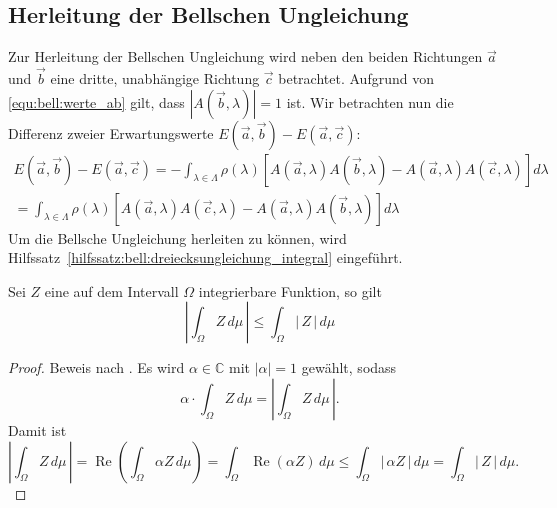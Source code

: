 \begin{refsection}
\subsection{Herleitung der Bellschen Ungleichung}
Zur Herleitung der Bellschen Ungleichung wird neben den beiden Richtungen 
$\vec{a}$ und $\vec{b}$ eine dritte, unabh\"angige Richtung $\vec{c}$ 
betrachtet. 
Aufgrund von \eqref{equ:bell:werte_ab} gilt, dass
$|A(\vec{b},\lambda)| = 1$ ist.
Wir betrachten nun die Differenz zweier Erwartungswerte
$E(\vec{a},\vec{b}) - E(\vec{a},\vec{c})$:
\begin{equation}\label{equ:bell:diff_e}
\begin{split}
    E(\vec{a},\vec{b}) - E(\vec{a},\vec{c}) =
    - \int_{\lambda\in\Lambda} \rho(\lambda) \left[ 
        A(\vec{a},\lambda) A(\vec{b},\lambda) - 
        A(\vec{a},\lambda) A(\vec{c},\lambda)
    \right] d\lambda \\
    = \int_{\lambda\in\Lambda} \rho(\lambda) \left[
         A(\vec{a},\lambda)A(\vec{c},\lambda) - 
         A(\vec{a},\lambda)A(\vec{b},\lambda)
    \right] d\lambda
\end{split}
\end{equation}
Um die Bellsche Ungleichung herleiten zu k\"onnen, wird 
Hilfssatz~\ref{hilfssatz:bell:dreiecksungleichung_integral}
eingef\"uhrt.
\begin{hilfssatz}\label{hilfssatz:bell:dreiecksungleichung_integral}
    Sei $Z$ eine auf dem Intervall $\Omega$ integrierbare Funktion, so gilt
    \[
        \left|\int_{\Omega} Z\, d\mu\,\right| 
        \leq \int_{\Omega} |\,Z\,|\, d\mu
    \]
\end{hilfssatz}
\begin{proof}
    Beweis nach \cite{Bell:HilfssatzTriangle}.
    Es wird $\alpha\in\mathbb{C}$ mit $|\alpha| = 1$ gew\"ahlt, sodass
    \[
        \alpha \cdot \int_{\Omega} Z\, d\mu = 
        \left|\int_{\Omega} Z\, d\mu\,\right|.
    \]
    Damit ist
    \[
        \left|\int_{\Omega} Z\, d\mu\,\right| = 
        \operatorname{Re}\left( \int_{\Omega}\alpha Z \,d\mu \right) = 
        \int_{\Omega}\operatorname{Re}(\alpha Z)\,d\mu
        \leq
        \int_{\Omega} |\,\alpha Z\,|\, d\mu = 
        \int_{\Omega} |\,Z\,|\, d\mu.
    \]
\end{proof}


\end{refsection}

